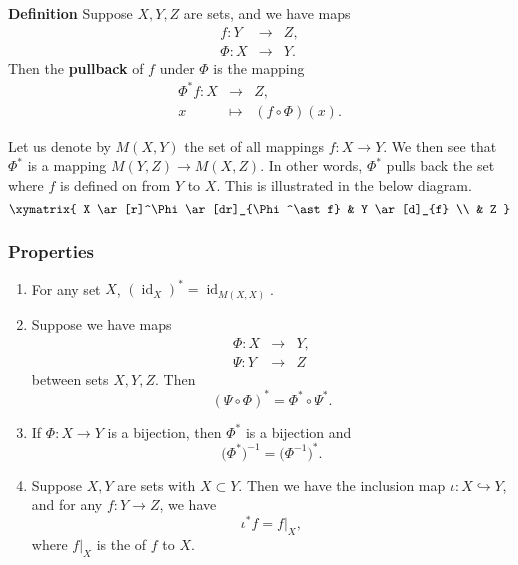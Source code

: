 \documentclass[12pt]{article}
\begin{document}
{\bf Definition}
Suppose $X,Y,Z$ are sets, and we have maps
\begin{eqnarray*}
 f\colon Y&\to& Z, \\
 \Phi\colon X&\to& Y.
\end{eqnarray*}
Then the {\bf pullback} of $f$ under $\Phi$ is the mapping
\begin{eqnarray*}
\Phi^\ast f\colon  X &\to& Z, \\
             x&\mapsto& (f\circ\Phi)(x).
\end{eqnarray*}

Let us denote by $M(X,Y)$ the set of all mappings $f\colon X\to Y$.
We then see that $\Phi^\ast$ is a mapping $M(Y,Z)\to M(X,Z)$.
In other words, $\Phi^\ast$ pulls back the set where $f$ is 
defined on from $Y$ to $X$. This is illustrated in the below diagram.
$$
\xymatrix{
 X \ar[r]^\Phi\ar[dr]_{\Phi^\ast f} & Y \ar[d]_{f} \\
  &  Z 
 }
$$

\subsubsection{Properties}
\begin{enumerate}
\item For any set $X$,
 $(\operatorname{id}_X)^\ast = \operatorname{id}_{M(X,X)}$.
\item Suppose we have maps
\begin{eqnarray*}
 \Phi\colon X&\to& Y, \\
 \Psi\colon Y&\to& Z
\end{eqnarray*}
between sets $X,Y,Z$. Then
$$ (\Psi\circ \Phi)^\ast = \Phi^\ast \circ \Psi^\ast.$$
\item If $\Phi\colon X\to Y$ is a bijection, then
$\Phi^\ast$ is a bijection and
$$
  \big(\Phi^\ast\big)^{-1} = \big(\Phi^{-1}\big)^\ast.
$$
\item Suppose $X,Y$ are sets with $X\subset Y$. 
Then we have the inclusion map $\iota:X\hookrightarrow Y$, and 
for any $f\colon Y\to Z$, we have 
$$ 
  \iota^\ast f = f|_X,
$$
where $f|_X$ is the  of $f$ to $X$. 
\end{enumerate}
\end{document}
